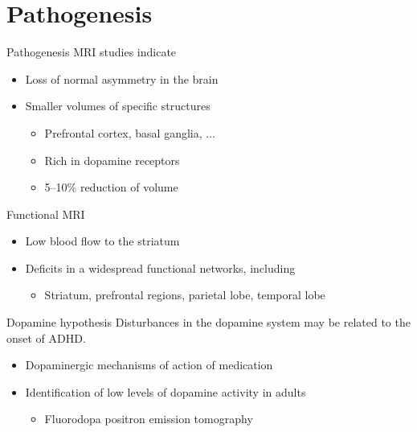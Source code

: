\documentclass{beamer}
\begin{document}
\section{Pathogenesis}
\begin{frame}{Pathogenesis}
    MRI studies indicate

    \begin{itemize}
        \item Loss of normal asymmetry in the brain
        \item Smaller volumes of specific structures
        \begin{itemize}
            \item Prefrontal cortex, basal ganglia, ...
            \item Rich in dopamine receptors
            \item 5--10\% reduction of volume
        \end{itemize}
    \end{itemize}
\end{frame}

\begin{frame}{Functional MRI}
    \begin{itemize}
        \item Low blood flow to the striatum
        \item Deficits in a widespread functional networks, including
        \begin{itemize}
            \item Striatum, prefrontal regions, parietal lobe, temporal lobe
        \end{itemize}
    \end{itemize}
\end{frame}

\begin{frame}{Dopamine hypothesis}
    Disturbances in the dopamine system may be related to the onset of ADHD.

    \begin{itemize}
        \item Dopaminergic mechanisms of action of medication
        \item Identification of low levels of dopamine activity in adults
        \begin{itemize}
            \item Fluorodopa positron emission tomography
        \end{itemize}
    \end{itemize}
\end{frame}
\end{document}

